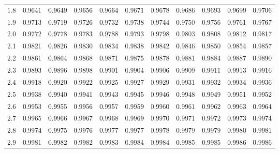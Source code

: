 \documentclass[11pt]{article}
\begin{document}
\begin{center}
\begin{tabular}{|c|c|c|c|c|c|c|c|c|c|c|}
			1.8 & 0.9641 & 0.9649 & 0.9656 & 0.9664 & 0.9671 & 0.9678 & 0.9686 & 0.9693 & 0.9699 & 0.9706\\
			1.9 & 0.9713 & 0.9719 & 0.9726 & 0.9732 & 0.9738 & 0.9744 & 0.9750 & 0.9756 & 0.9761 & 0.9767\\
			2.0 & 0.9772 & 0.9778 & 0.9783 & 0.9788 & 0.9793 & 0.9798 & 0.9803 & 0.9808 & 0.9812 & 0.9817\\
			2.1 & 0.9821 & 0.9826 & 0.9830 & 0.9834 & 0.9838 & 0.9842 & 0.9846 & 0.9850 & 0.9854 & 0.9857\\
			2.2 & 0.9861 & 0.9864 & 0.9868 & 0.9871 & 0.9875 & 0.9878 & 0.9881 & 0.9884 & 0.9887 & 0.9890\\
			2.3 & 0.9893 & 0.9896 & 0.9898 & 0.9901 & 0.9904 & 0.9906 & 0.9909 & 0.9911 & 0.9913 & 0.9916\\
			2.4 & 0.9918 & 0.9920 & 0.9922 & 0.9925 & 0.9927 & 0.9929 & 0.9931 & 0.9932 & 0.9934 & 0.9936\\
			2.5 & 0.9938 & 0.9940 & 0.9941 & 0.9943 & 0.9945 & 0.9946 & 0.9948 & 0.9949 & 0.9951 & 0.9952\\
			2.6 & 0.9953 & 0.9955 & 0.9956 & 0.9957 & 0.9959 & 0.9960 & 0.9961 & 0.9962 & 0.9963 & 0.9964\\
			2.7 & 0.9965 & 0.9966 & 0.9967 & 0.9968 & 0.9969 & 0.9970 & 0.9971 & 0.9972 & 0.9973 & 0.9974\\
			2.8 & 0.9974 & 0.9975 & 0.9976 & 0.9977 & 0.9977 & 0.9978 & 0.9979 & 0.9979 & 0.9980 & 0.9981\\
			2.9 & 0.9981 & 0.9982 & 0.9982 & 0.9983 & 0.9984 & 0.9984 & 0.9985 & 0.9985 & 0.9986 & 0.9986\\
			\hline
		\end{tabular}
	\end{center}
	
\end{document}

